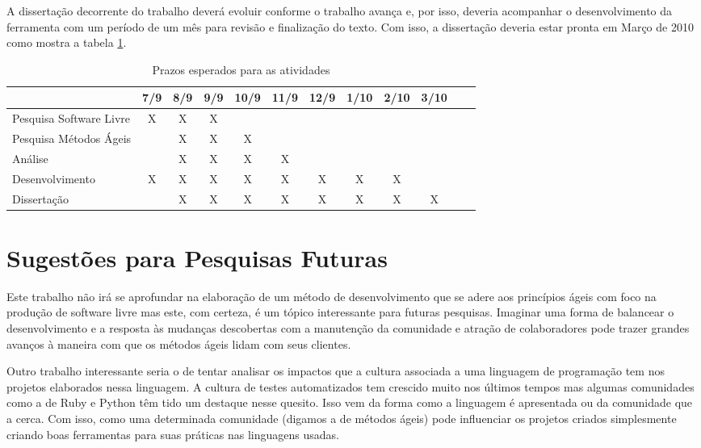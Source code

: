 A dissertação decorrente do trabalho deverá evoluir conforme o
trabalho avança e, por isso, deveria acompanhar o desenvolvimento da
ferramenta com um período de um mês para revisão e finalização do
texto. Com isso, a dissertação deveria estar pronta em Março de 2010
como mostra a tabela \ref{tab:crono}.

\begin{table}
  \centering
  \begin{tabular}{|l|c|c|c|c|c|c|c|c|c|c|c|}
    \hline
    & 7/9 & 8/9 & 9/9 & 10/9 & 11/9 & 12/9 &
    1/10 & 2/10 & 3/10\\
    \hline
    Pesquisa Software Livre & X & X & X & & & & & & \\
    \hline
    Pesquisa Métodos Ágeis & & X & X & X & & & & &\\
    \hline
    Análise & & X & X & X & X & & & &\\
    \hline
    Desenvolvimento & X & X & X & X & X & X & X & X & \\
    \hline
    Dissertação & & X & X & X & X & X & X & X & X \\
    \hline
  \end{tabular}
  \caption{Prazos esperados para as atividades}
  \label{tab:crono}
\end{table}

\section{Sugestões para Pesquisas Futuras}
\label{sec:sugestoes}

Este trabalho não irá se aprofundar na elaboração de um método de
desenvolvimento que se adere aos princípios ágeis com foco na produção
de software livre mas este, com certeza, é um tópico interessante para
futuras pesquisas. Imaginar uma forma de balancear o desenvolvimento e
a resposta às mudanças descobertas com a manutenção da comunidade e
atração de colaboradores pode trazer grandes avanços à maneira com que
os métodos ágeis lidam com seus clientes.

Outro trabalho interessante seria o de tentar analisar os impactos que
a cultura associada a uma linguagem de programação tem nos projetos
elaborados nessa linguagem. A cultura de testes automatizados tem
crescido muito nos últimos tempos mas algumas comunidades como a de
Ruby e Python têm tido um destaque nesse quesito. Isso vem da forma
como a linguagem é apresentada ou da comunidade que a cerca. Com isso,
como uma determinada comunidade (digamos a de métodos ágeis) pode
influenciar os projetos criados simplesmente criando boas ferramentas
para suas práticas nas linguagens usadas.
